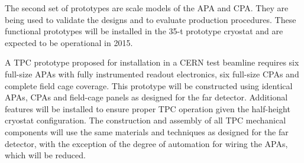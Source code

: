 The second set of prototypes are scale models of the APA and CPA. They
are being used to validate the designs and to evaluate production
procedures. These functional prototypes will be installed in the 35-t
prototype cryostat and are expected to be operational in 2015.

A TPC prototype proposed for installation in a CERN test beamline
requires six full-size APAs with fully instrumented readout
electronics, six full-size CPAs and complete field cage coverage. This
prototype will be constructed using identical APAs, CPAs and
field-cage panels as designed for the far detector. Additional
features will be installed to ensure proper TPC operation given the
half-height cryostat configuration. The construction and assembly of
all TPC mechanical components will use the same materials and
techniques as designed for the far detector, with the exception of the
degree of automation for wiring the APAs, which will be reduced.
